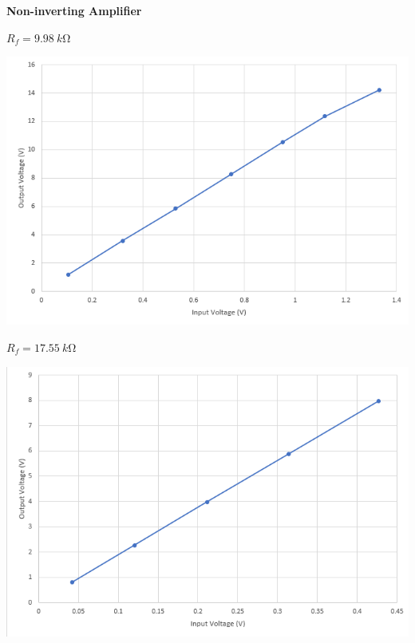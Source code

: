 \begin{center}
    \textbf{Non-inverting Amplifier}
\end{center}
\begin{center}
    $R_f = \SI{9.98}{k\ohm}$
\end{center}
\begin{center}
    \includegraphics[scale = 0.7]{OPAMP Config/noninvampf1.png}
\end{center}
\begin{center}
    $R_f = \SI{17.55}{k\ohm}$
\end{center}
\begin{center}
    \includegraphics[scale = 0.7]{OPAMP Config/noninvampf2.png}
\end{center}
\clearpage
